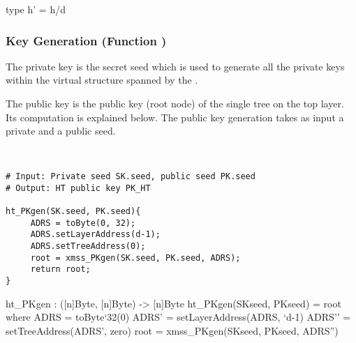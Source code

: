 \begin{code}
  type h' = h/d
\end{code}


\subsubsection{\hyper Key Generation (Function \htpkgen)}

   The \hyper private key is the secret seed \sseed which is used to generate
   all the \wotsp private keys within the virtual structure spanned by the \hyper.

   The \hyper public key is the public key (root node) of the single \xmss tree on
   the top layer. Its computation is explained below. The public key generation
   takes as input a private and a public seed.

   \begin{lstlisting}[label=alg:xmssmt:pkgen, language=pseudoc,
                   caption=\htpkgen\ -- Generating an HT public key.]


# Input: Private seed SK.seed, public seed PK.seed
# Output: HT public key PK_HT

ht_PKgen(SK.seed, PK.seed){
     ADRS = toByte(0, 32);
     ADRS.setLayerAddress(d-1);
     ADRS.setTreeAddress(0);
     root = xmss_PKgen(SK.seed, PK.seed, ADRS);
     return root;
}

\end{lstlisting}

\begin{code}
  ht_PKgen : ([n]Byte, [n]Byte) -> [n]Byte
  ht_PKgen(SKseed, PKseed) = root where
    ADRS = toByte`{32}(0)
    ADRS' = setLayerAddress(ADRS, `d-1)
    ADRS'' = setTreeAddress(ADRS', zero)
    root = xmss_PKgen(SKseed, PKseed, ADRS'')
\end{code}

%

